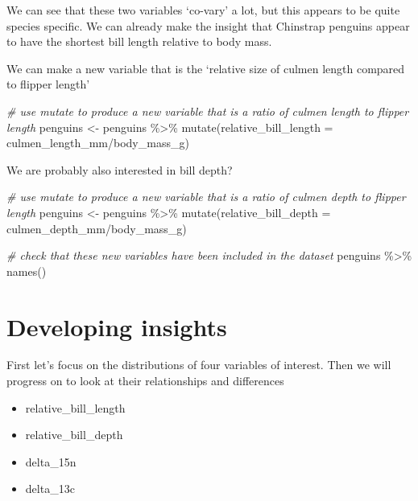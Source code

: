 \documentclass[
]{book}
\newenvironment{Shaded}{\begin{snugshade}}{\end{snugshade}}
\newcommand{\AttributeTok}[1]{\textcolor[rgb]{0.77,0.63,0.00}{#1}}
\newcommand{\CommentTok}[1]{\textcolor[rgb]{0.56,0.35,0.01}{\textit{#1}}}
\newcommand{\FunctionTok}[1]{\textcolor[rgb]{0.00,0.00,0.00}{#1}}
\newcommand{\NormalTok}[1]{#1}
\newcommand{\OtherTok}[1]{\textcolor[rgb]{0.56,0.35,0.01}{#1}}
\newcommand{\SpecialCharTok}[1]{\textcolor[rgb]{0.00,0.00,0.00}{#1}}
\begin{document}
We can see that these two variables `co-vary' a lot, but this appears to be quite species specific. We can already make the insight that Chinstrap penguins appear to have the shortest bill length relative to body mass.

We can make a new variable that is the `relative size of culmen length compared to flipper length'

\begin{Shaded}
\begin{Highlighting}[]
\CommentTok{\# use mutate to produce a new variable that is a ratio of culmen length to flipper length}
\NormalTok{penguins }\OtherTok{\textless{}{-}}\NormalTok{ penguins }\SpecialCharTok{\%\textgreater{}\%} 
  \FunctionTok{mutate}\NormalTok{(}\AttributeTok{relative\_bill\_length =}\NormalTok{ culmen\_length\_mm}\SpecialCharTok{/}\NormalTok{body\_mass\_g)}
\end{Highlighting}
\end{Shaded}

We are probably also interested in bill depth?

\begin{Shaded}
\begin{Highlighting}[]
\CommentTok{\# use mutate to produce a new variable that is a ratio of culmen depth to flipper length}
\NormalTok{penguins }\OtherTok{\textless{}{-}}\NormalTok{ penguins }\SpecialCharTok{\%\textgreater{}\%} 
  \FunctionTok{mutate}\NormalTok{(}\AttributeTok{relative\_bill\_depth =}\NormalTok{ culmen\_depth\_mm}\SpecialCharTok{/}\NormalTok{body\_mass\_g)}

\CommentTok{\# check that these new variables have been included in the dataset}
\NormalTok{penguins }\SpecialCharTok{\%\textgreater{}\%} 
  \FunctionTok{names}\NormalTok{()}
\end{Highlighting}
\end{Shaded}

\hypertarget{developing-insights}{%
\section{Developing insights}\label{developing-insights}}

First let's focus on the distributions of four variables of interest. Then we will progress on to look at their relationships and differences

\begin{itemize}
\item
  relative\_bill\_length
\item
  relative\_bill\_depth
\item
  delta\_15n
\item
  delta\_13c
\end{itemize}
\end{document}
